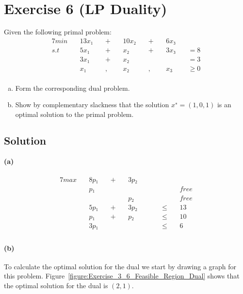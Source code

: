 \documentclass[a4paper, 12pt]{report}
\begin{document}
\section{Exercise 6 (LP Duality)}

Given the following primal problem:
\begin{alignat*}{7}
    min ~&& 13x₁ ~&& + ~&& 10x₂ ~&& + ~&& 6x₃ ~&&  \\
    s.t ~&& 5x₁  ~&& + ~&& x₂   ~&& + ~&& 3x₃ ~&&  = 8\\
        ~&& 3x₁  ~&& + ~&& x₂   ~&&   ~&&     ~&&  = 3\\
        ~&& x₁   ~&& , ~&& x₂   ~&& , ~&& x_3 ~&&  ≥0\\
\end{alignat*}
\begin{enumerate}[(a)]
    \item Form the corresponding dual problem.
    \item Show by complementary slackness that the solution $x^∗ = (1, 0, 1)$
          is an optimal solution to the primal problem.
\end{enumerate}

\subsection{Solution}

\paragraph{(a)}
\begin{alignat*}{7}
    max ~&& 8p₁ ~&& +  ~&& 3p₂ ~&&   ~&&   ~&&\\
        ~&& p₁  ~&&    ~&&     ~&&   ~&&   ~&& free\\
        ~&&     ~&&    ~&&  p₂ ~&&   ~&&   ~&& free\\
        ~&& 5p₁ ~&& +  ~&& 3p₂ ~&&   ~&& ≤ ~&& 13\\
        ~&&  p₁ ~&& +  ~&&  p₂ ~&&   ~&& ≤ ~&& 10\\
        ~&& 3p₁ ~&&    ~&&     ~&&   ~&& ≤ ~&& 6\\
\end{alignat*}

\paragraph{(b)} To calculate the optimal solution for the dual we start by
drawing a graph for this problem.
Figure~\ref{figure:Exercise_3_6_Feasible_Region_Dual} shows that the optimal
solution for the dual is $(2,1)$.\\
\end{document}
